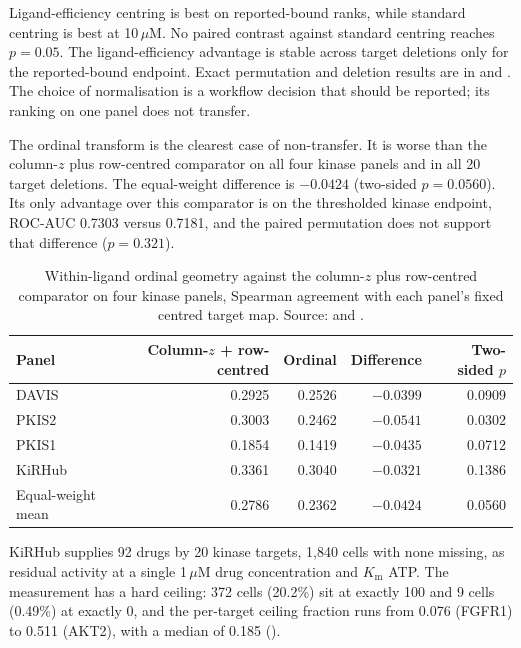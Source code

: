 Ligand-efficiency centring is best on reported-bound ranks, while standard centring is best at
10\,$\mu$M. No paired contrast against standard centring reaches $p=0.05$. The ligand-efficiency
advantage is stable across target deletions only for the reported-bound endpoint. Exact
permutation and deletion results are in
 and
. The choice of normalisation is a
workflow decision that should be reported; its ranking on one panel does not transfer.

The ordinal transform is the clearest case of non-transfer. It is worse than the column-$z$ plus
row-centred comparator on all four kinase panels and in all 20 target deletions. The equal-weight
difference is $-0.0424$ (two-sided $p=0.0560$). Its only advantage over this comparator is on the
thresholded kinase endpoint, ROC-AUC 0.7303 versus 0.7181, and the paired permutation does not
support that difference ($p=0.321$).

\begin{table}[htbp]
\centering
\small
\caption[Within-ligand ordinal geometry on four kinase panels]{Within-ligand ordinal geometry against the column-$z$ plus row-centred comparator on four kinase panels, Spearman
agreement with each panel's fixed centred target map. Source:
 and
.}
\label{tab:s6-ordinal}
\begin{tabular}{lrrrr}
\toprule
Panel & Column-$z$ + row-centred & Ordinal & Difference & Two-sided $p$ \\
\midrule
DAVIS  & 0.2925 & 0.2526 & $-0.0399$ & 0.0909 \\
PKIS2  & 0.3003 & 0.2462 & $-0.0541$ & 0.0302 \\
PKIS1  & 0.1854 & 0.1419 & $-0.0435$ & 0.0712 \\
KiRHub & 0.3361 & 0.3040 & $-0.0321$ & 0.1386 \\
Equal-weight mean & 0.2786 & 0.2362 & $-0.0424$ & 0.0560 \\
\bottomrule
\end{tabular}
\end{table}


KiRHub supplies 92 drugs by 20 kinase targets, 1{,}840 cells with none missing, as residual
activity at a single 1\,$\mu$M drug concentration and $K_\mathrm{m}$ ATP. The measurement has a
hard ceiling: 372 cells (20.2\%) sit at exactly 100 and 9 cells (0.49\%) at exactly 0, and the
per-target ceiling fraction runs from 0.076 (FGFR1) to 0.511 (AKT2), with a median of 0.185
().

